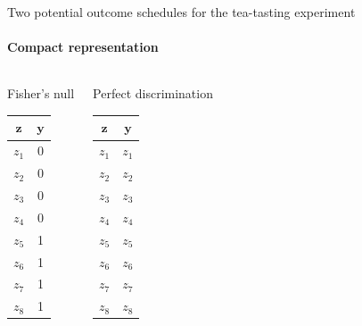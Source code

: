 \begin{frame}{Two potential outcome schedules for the tea-tasting experiment}
\framesubtitle{Compact representation}

\begin{columns}
  \begin{Column}
\hspace{1em}    { Fisher's null} \\
    \begin{tabular}{cc} \hline
 $\mathbf{z}$ & $\mathbf{y}$ \\ \hline
$z_1$ &  0   \\
$z_2$ &  0   \\
$z_3$ &  0   \\
$z_4$ &  0   \\
$z_5$ &  1   \\
$z_6$ &  1   \\
$z_7$ &  1   \\
$z_8$ &  1   \\ \hline
    \end{tabular}

  \end{Column}
  \begin{Column}
\hspace{1em}   { Perfect discrimination} \\
    \begin{tabular}{cc} \hline
 $\mathbf{z}$ & $\mathbf{y}$ \\ \hline
$z_1$ & $z_1$  \\
$z_2$ & $z_2$  \\
$z_3$ & $z_3$  \\
$z_4$ & $z_4$  \\
$z_5$ & $z_5$  \\
$z_6$ & $z_6$  \\
$z_7$ & $z_7$  \\
$z_8$ & $z_8$  \\ \hline
    \end{tabular}

  \end{Column}

\end{columns}



\end{frame}
